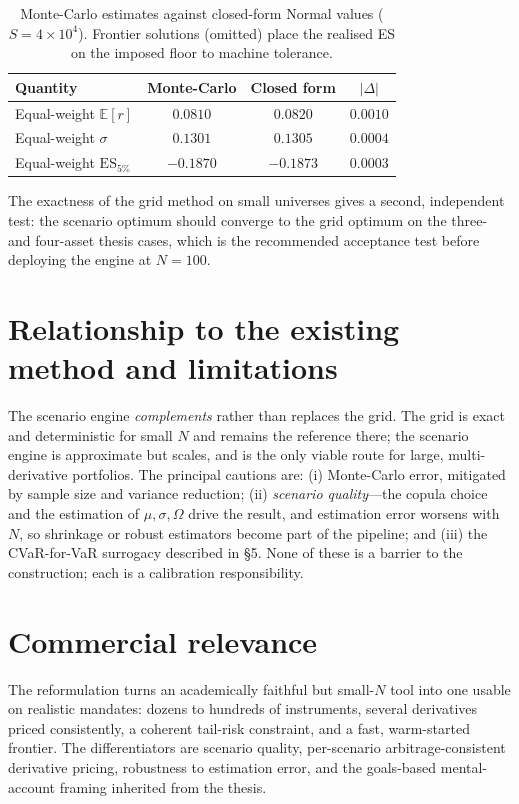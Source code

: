 \documentclass[11pt]{article}
\newcommand{\E}{\mathbb{E}}
\begin{document}
\begin{table}[h]
\centering
\begin{tabular}{lccc}
\toprule
Quantity & Monte-Carlo & Closed form & $|\Delta|$ \\
\midrule
Equal-weight $\E[r]$            & $0.0810$ & $0.0820$ & $0.0010$ \\
Equal-weight $\sigma$           & $0.1301$ & $0.1305$ & $0.0004$ \\
Equal-weight $\mathrm{ES}_{5\%}$& $-0.1870$& $-0.1873$& $0.0003$ \\
\bottomrule
\end{tabular}
\caption{Monte-Carlo estimates against closed-form Normal values
($S=4\times10^{4}$). Frontier solutions (omitted) place the realised ES on the
imposed floor to machine tolerance.}
\label{tab:val}
\end{table}

The exactness of the grid method on small universes gives a second, independent
test: the scenario optimum should converge to the grid optimum on the three- and
four-asset thesis cases, which is the recommended acceptance test before deploying
the engine at $N=100$.

\section{Relationship to the existing method and limitations}
The scenario engine \emph{complements} rather than replaces the grid. The grid is
exact and deterministic for small $N$ and remains the reference there; the scenario
engine is approximate but scales, and is the only viable route for large, multi-derivative
portfolios. The principal cautions are: (i) Monte-Carlo error, mitigated by sample
size and variance reduction; (ii) \emph{scenario quality}---the copula choice and the
estimation of $\mu,\sigma,\Omega$ drive the result, and estimation error worsens with
$N$, so shrinkage or robust estimators become part of the pipeline; and (iii) the
CVaR-for-VaR surrogacy described in \S5. None of these is a barrier to the
construction; each is a calibration responsibility.

\section{Commercial relevance}
The reformulation turns an academically faithful but small-$N$ tool into one usable
on realistic mandates: dozens to hundreds of instruments, several derivatives priced
consistently, a coherent tail-risk constraint, and a fast, warm-started frontier. The
differentiators are scenario quality, per-scenario arbitrage-consistent derivative
pricing, robustness to estimation error, and the goals-based mental-account framing
inherited from the thesis.
\end{document}
